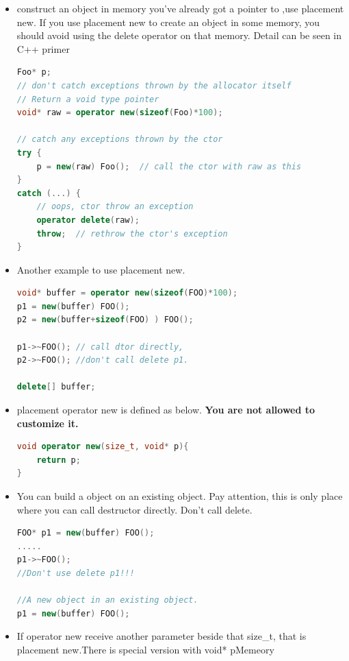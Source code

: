 \documentclass[a4paper,12pt,twoside]{book}
\begin{document}
\begin{itemize}
	\item construct an object in memory you've already got a pointer to ,use placement new. If you use placement new to create an object in some memory, you should avoid using the delete operator on that memory.  Detail can be seen in C++ primer
\begin{lstlisting}[frame=single, language=c++]
Foo* p;
// don't catch exceptions thrown by the allocator itself
// Return a void type pointer
void* raw = operator new(sizeof(Foo)*100);
	
// catch any exceptions thrown by the ctor
try {
	p = new(raw) Foo();  // call the ctor with raw as this
}
catch (...) {
	// oops, ctor throw an exception
	operator delete(raw);
	throw;  // rethrow the ctor's exception
}
\end{lstlisting}
	
	\item Another example to use placement new.
\begin{lstlisting}[frame=single, language=c++]
void* buffer = operator new(sizeof(FOO)*100);
p1 = new(buffer) FOO();
p2 = new(buffer+sizeof(FOO) ) FOO();

p1->~FOO(); // call dtor directly,
p2->~FOO(); //don't call delete p1.
	
delete[] buffer;
\end{lstlisting}
	
	\item placement operator new is defined as below. \textbf{You are not allowed to customize it.}
\begin{lstlisting}[frame=single, language=c++]
	void operator new(size_t, void* p){
	return p;
}
\end{lstlisting}
	
	\item You can build a object on an existing object. Pay attention, this is only place where you can call destructor directly. Don't call delete. 
\begin{lstlisting}[frame=single, language=c++]
FOO* p1 = new(buffer) FOO();
.....
p1->~FOO();
//Don't use delete p1!!!
	
//A new object in an existing object.
p1 = new(buffer) FOO(); 
\end{lstlisting}
	
	\item If operator new receive another parameter beside that size\_t, that is placement new.There is special version with void* pMemeory
	

\end{itemize}
\end{document}
